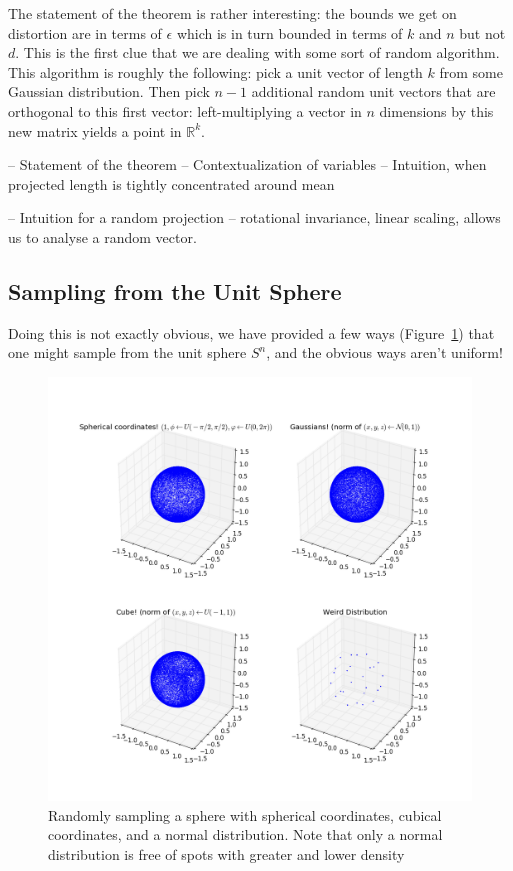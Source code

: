 \documentclass[11pt]{article}
\begin{document}
The statement of the theorem is rather interesting: the bounds we get on
distortion are in terms of $\epsilon$ which is in turn bounded in terms of $k$
and $n$ but not $d$. This is the first clue that we are dealing with some sort
of random algorithm. This algorithm is roughly the following: pick a unit vector
of length $k$ from some Gaussian distribution. Then pick $n-1$ additional random
unit vectors that are orthogonal to this first vector: left-multiplying a vector
in $n$ dimensions by this new matrix yields a point in $\mathbb{R}^k$.

-- Statement of the theorem
-- Contextualization of variables
-- Intuition, when projected length is tightly concentrated around mean

-- Intuition for a random projection
-- rotational invariance, linear scaling, allows us to analyse a random vector.

\subsection{Sampling from the Unit Sphere}

Doing this is not exactly obvious, we have provided a few ways
(Figure~\ref{fig:spheres}) that one might sample from the unit sphere $S^n$, and
the obvious ways aren't uniform!

\begin{figure}
  \begin{center}
    \includegraphics[width=0.9\linewidth]{spheres.png}
  \end{center}

  \caption{Randomly sampling a sphere with spherical coordinates, cubical
    coordinates, and a normal distribution. Note that only a normal distribution
    is free of spots with greater and lower density}
  \label{fig:spheres}
\end{figure}
\end{document}
